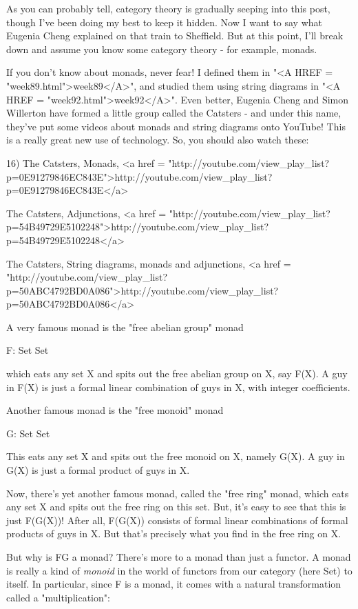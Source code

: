 As you can probably tell, category theory is gradually seeping
into this post, though I've been doing my best to keep it
hidden.  Now I want to say what Eugenia Cheng explained on 
that train to Sheffield.  But at this point, I'll break down and
assume you know some category theory - for example, monads.

If you don't know about monads, never fear!  I defined them in 
"<A HREF = "week89.html">week89</A>", and studied them using string diagrams in "<A HREF = "week92.html">week92</A>". 
Even better, Eugenia Cheng and Simon Willerton have formed a 
little group called the Catsters - and under this name, they've 
put some videos about monads and string diagrams onto YouTube!  
This is a really great new use of technology.  So, you should 
also watch these:

16) The Catsters, Monads, 
<a href = "http://youtube.com/view_play_list?p=0E91279846EC843E">http://youtube.com/view_play_list?p=0E91279846EC843E</a>

The Catsters, Adjunctions, 
<a href = "http://youtube.com/view_play_list?p=54B49729E5102248">http://youtube.com/view_play_list?p=54B49729E5102248</a>

The Catsters, String diagrams, monads and adjunctions,
<a href = "http://youtube.com/view_play_list?p=50ABC4792BD0A086">http://youtube.com/view_play_list?p=50ABC4792BD0A086</a>

A very famous monad is the "free abelian group" monad

F: Set \to  Set

which eats any set X and spits out the free abelian group on X, 
say F(X).   A guy in F(X) is just a formal linear combination
of guys in X, with integer coefficients.

Another famous monad is the "free monoid" monad 

G: Set \to  Set

This eats any set X and spits out the free monoid on X, namely 
G(X).  A guy in G(X) is just a formal product of guys in X.

Now, there's yet another famous monad, called the "free 
ring" monad, which eats any set X and spits out the free ring on
this set.  But, it's easy to see that this is just F(G(X))!
After all, F(G(X)) consists of formal linear combinations of
formal products of guys in X.  But that's precisely what you find
in the free ring on X.  

But why is FG a monad?  There's more to a monad than just a 
functor.  A monad is really a kind of \emph{monoid} in the world of
functors from our category (here Set) to itself.  In particular, 
since F is a monad, it comes with a natural transformation called
a "multiplication":


